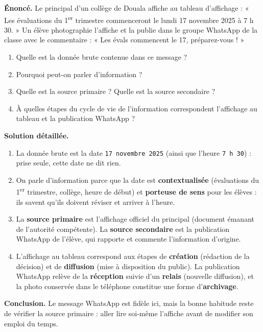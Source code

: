 \documentclass[11pt]{article}
\begin{document}
\begin{exoresolu}
\textbf{Énoncé.} Le principal d'un collège de Douala affiche au tableau d'affichage : « Les évaluations du 1\textsuperscript{er} trimestre commenceront le lundi 17 novembre 2025 à 7 h 30. » Un élève photographie l'affiche et la publie dans le groupe WhatsApp de la classe avec le commentaire : « Les évals commencent le 17, préparez-vous ! »
\begin{enumerate}
\item Quelle est la donnée brute contenue dans ce message ?
\item Pourquoi peut-on parler d'information ?
\item Quelle est la source primaire ? Quelle est la source secondaire ?
\item À quelles étapes du cycle de vie de l'information correspondent l'affichage au tableau et la publication WhatsApp ?
\end{enumerate}
\tcblower
\textbf{Solution détaillée.}
\begin{enumerate}
\item La donnée brute est la date \texttt{17 novembre 2025} (ainsi que l'heure \texttt{7 h 30}) : prise seule, cette date ne dit rien.
\item On parle d'information parce que la date est \textbf{contextualisée} (évaluations du 1\textsuperscript{er} trimestre, collège, heure de début) et \textbf{porteuse de sens} pour les élèves : ils savent qu'ils doivent réviser et arriver à l'heure.
\item La \textbf{source primaire} est l'affichage officiel du principal (document émanant de l'autorité compétente). La \textbf{source secondaire} est la publication WhatsApp de l'élève, qui rapporte et commente l'information d'origine.
\item L'affichage au tableau correspond aux étapes de \textbf{création} (rédaction de la décision) et de \textbf{diffusion} (mise à disposition du public). La publication WhatsApp relève de la \textbf{réception} suivie d'un \textbf{relais} (nouvelle diffusion), et la photo conservée dans le téléphone constitue une forme d'\textbf{archivage}.
\end{enumerate}
\textbf{Conclusion.} Le message WhatsApp est fidèle ici, mais la bonne habitude reste de vérifier la source primaire : aller lire soi-même l'affiche avant de modifier son emploi du temps.
\end{exoresolu}
\end{document}
